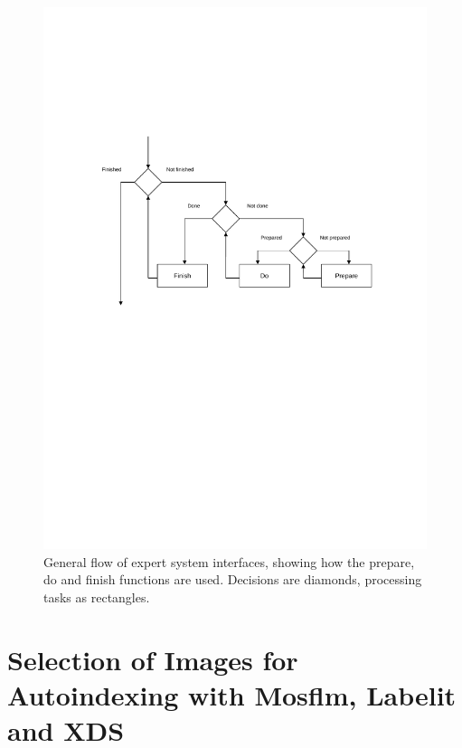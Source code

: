 \documentclass[preprint,pdf]{iucr}
\begin{document}
\begin{figure}
\caption{General flow of expert system interfaces, showing how the
  prepare, do and finish functions are used. Decisions are diamonds,
  processing tasks as rectangles.
\label{figure:fig6}}
\centering
\includegraphics[scale=0.5]{figures/Fig6.pdf}
\end{figure}







{}

%

\appendix

\section{Selection of Images for Autoindexing with Mosflm, Labelit and
XDS}
\end{document}
